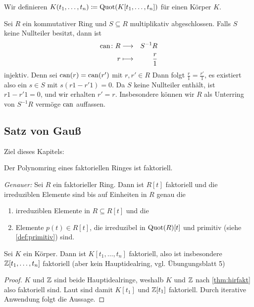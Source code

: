 \documentclass[12pt,a4paper]{scrartcl}
\begin{document}
Wir definieren $K(t_1,\dots,t_n) \coloneqq \operatorname{Quot}(K[t_1,\dots,t_n])$ für einen Körper $K$.


\begin{bem}
	Sei $R$ ein kommutativer Ring und $S\subseteq R$ multiplikativ abgeschlossen. Falls $S$ keine Nullteiler besitzt, dann ist
	\begin{eqnarray*}
		\operatorname{can}\colon R &\longrightarrow& S^{-1}R\\
		r & \longmapsto& \frac r1
	\end{eqnarray*}
	injektiv. Denn sei $\operatorname{can}(r) = \operatorname{can}(r')$ mit $r,r'\in R$ Dann folgt $\frac r1 = \frac {r'}1$, es existiert also ein $ s\in S$ mit $ s(r1-r'1) = 0$. Da $S$ keine Nullteiler enthält, ist $r1 -r'1 = 0$, und wir erhalten $r' = r$.
	Insbesondere können wir $R$ als Unterring von $S^{-1}R$ vermöge $\operatorname{can}$ auffassen.
\end{bem}

\subsection{Satz von Gauß}
Ziel dieses Kapitels:
\begin{satz}\label{thm:gauss}
	Der Polynomring eines faktoriellen Ringes ist faktoriell.
	
	
	\emph{Genauer:} Sei $R$ ein faktorieller Ring. Dann ist $R[t]$ faktoriell und die irreduziblen Elemente sind bis auf Einheiten in $R$ genau die
	\begin{enumerate}[label=(\alph*)]
		\item irreduziblen Elemente in $R\subseteq R[t]$ und die \label{enumi:gauss:a}
		\item Elemente $p(t) \in R[t]$, die irreduzibel in $\operatorname{Quot}(R)[t]$ und primitiv \textup(siehe \cref{def:primitiv}\textup) sind. \label{enumi:gauss:b}
	\end{enumerate}
\end{satz}

\begin{kor}
	Sei $K$ ein Körper. Dann ist $K[t_1,\dots,t_n]$ faktoriell, also ist insbesondere $\mathbb Z[t_1,\dots, t_n]$ faktoriell \textup(aber kein Hauptidealring, vgl. Übungungsblatt 5\textup)
\end{kor}

\begin{proof} $K$ und $\mathbb Z$ sind beide Hauptidealringe, weshalb $K$ und $\mathbb Z$ nach \cref{thm:hirfakt} also faktoriell sind. Laut  sind damit $K[t_1]$ und $\mathbb Z[t_1]$ faktoriell. Durch iterative Anwendung folgt die Aussage.
\end{proof}
\end{document}
